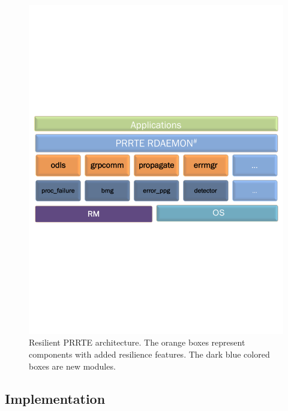 \documentclass[5p,times,twocolumn]{elsarticle}
\newcommand{\prrte}[0]{\textsc{PRRTE}\xspace}
\begin{document}
\begin{figure}[h]
  \centering
  \includegraphics[trim=0.2cm 9.0cm 0.2cm 9cm,width=\linewidth]{PMIx_PRRTE.pdf}\vspace{-1em}
  \caption{Resilient \prrte architecture. The orange boxes represent components with added resilience features. The dark blue colored boxes are new modules.}\label{fig:prrte}
\end{figure}

\subsection{Implementation}

\end{document}
